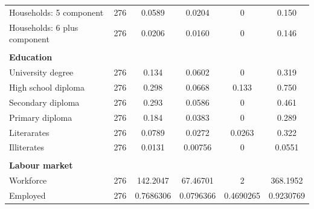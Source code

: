 \documentclass[12pt]{article}
\theoremstyle{plain}
\theoremstyle{plain}
\theoremstyle{plain}
\theoremstyle{definition}
\theoremstyle{plain}
\theoremstyle{definition}
\theoremstyle{plain}
\theoremstyle{remark}
\theoremstyle{definition}
\theoremstyle{definition}
\theoremstyle{plain}
\begin{document}
\begin{table}[H]
{\begin{tabular}{p{12.835em}lllll}
    \multicolumn{1}{l}{Households: 5 component} & \multicolumn{1}{c}{276} & \multicolumn{1}{c}{0.0589} & \multicolumn{1}{c}{0.0204} & \multicolumn{1}{c}{0} & \multicolumn{1}{c}{0.150} \\
    \multicolumn{1}{l}{Households: 6 plus component} & \multicolumn{1}{c}{276} & \multicolumn{1}{c}{0.0206} & \multicolumn{1}{c}{0.0160} & \multicolumn{1}{c}{0} & \multicolumn{1}{c}{0.146} \\
    \multicolumn{1}{r}{} &       &       &       &       &  \\
    \multicolumn{1}{l}{\textbf{Education}} &       &       &       &       &  \\
    \multicolumn{1}{l}{University degree} & \multicolumn{1}{c}{276} & \multicolumn{1}{c}{0.134} & \multicolumn{1}{c}{0.0602} & \multicolumn{1}{c}{0} & \multicolumn{1}{c}{0.319} \\
    \multicolumn{1}{l}{High school diploma} & \multicolumn{1}{c}{276} & \multicolumn{1}{c}{0.298} & \multicolumn{1}{c}{0.0668} & \multicolumn{1}{c}{0.133} & \multicolumn{1}{c}{0.750} \\
    \multicolumn{1}{l}{Secondary diploma} & \multicolumn{1}{c}{276} & \multicolumn{1}{c}{0.293} & \multicolumn{1}{c}{0.0586} & \multicolumn{1}{c}{0} & \multicolumn{1}{c}{0.461} \\
    \multicolumn{1}{l}{Primary diploma} & \multicolumn{1}{c}{276} & \multicolumn{1}{c}{0.184} & \multicolumn{1}{c}{0.0383} & \multicolumn{1}{c}{0} & \multicolumn{1}{c}{0.289} \\
    \multicolumn{1}{l}{Literarates} & \multicolumn{1}{c}{276} & \multicolumn{1}{c}{0.0789} & \multicolumn{1}{c}{0.0272} & \multicolumn{1}{c}{0.0263} & \multicolumn{1}{c}{0.322} \\
    \multicolumn{1}{l}{Illiterates} & \multicolumn{1}{c}{276} & \multicolumn{1}{c}{0.0131} & \multicolumn{1}{c}{0.00756} & \multicolumn{1}{c}{0} & \multicolumn{1}{c}{0.0551} \\
    \multicolumn{1}{r}{} &       &       &       &       &  \\
    \multicolumn{1}{l}{\textbf{Labour market}} &       &       &       &       &  \\
    \multicolumn{1}{l}{Workforce} & \multicolumn{1}{c}{276} & \multicolumn{1}{c}{142.2047} & \multicolumn{1}{c}{67.46701} & \multicolumn{1}{c}{2} & \multicolumn{1}{c}{368.1952} \\
    \multicolumn{1}{l}{Employed } & \multicolumn{1}{c}{276} & \multicolumn{1}{c}{0.7686306} & \multicolumn{1}{c}{0.0796366} & \multicolumn{1}{c}{0.4690265} & \multicolumn{1}{c}{0.9230769} \\

\end{tabular}}
\end{table}
\end{document}
